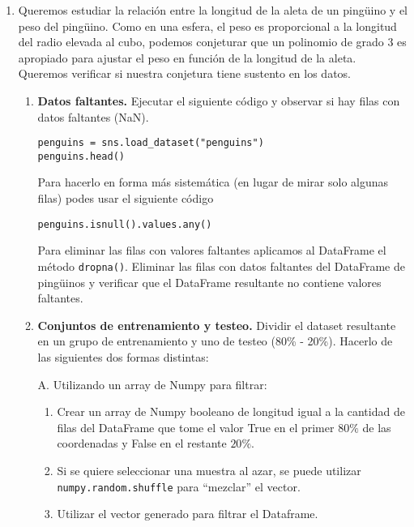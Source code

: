 \documentclass[a4paper,11pt]{article}
\theoremstyle{definition}
\begin{document}
\begin{enumerate}

\item \label{ejer:grado3} Queremos estudiar la relación entre la longitud de la aleta de un ping\"uino y el peso del ping\"uino. Como en una esfera, el peso es proporcional a la longitud del radio elevada al cubo, podemos conjeturar que un polinomio de grado 3 es apropiado para ajustar el peso en función de la longitud de la aleta. Queremos verificar si nuestra conjetura tiene sustento en los datos.
\begin{enumerate}
\item \label{item:nan} \textbf{Datos faltantes.} Ejecutar el siguiente c\'odigo y observar si hay filas con datos faltantes (NaN).
\begin{lstlisting}
penguins = sns.load_dataset("penguins")
penguins.head()
\end{lstlisting}

Para hacerlo en forma más sistemática (en lugar de mirar solo algunas filas) podes usar el siguiente código
\begin{lstlisting}
penguins.isnull().values.any()
\end{lstlisting}

Para eliminar las filas con valores faltantes aplicamos al DataFrame el método \lstinline{dropna()}. Eliminar las filas con datos faltantes del DataFrame de ping\"uinos y verificar que el DataFrame resultante no contiene valores faltantes.

\item \textbf{Conjuntos de entrenamiento y testeo.} Dividir el dataset resultante  en un grupo de entrenamiento y uno de testeo (80\% - 20\%).
Hacerlo de las siguientes dos formas distintas:

\vspace{.5cm}

A. Utilizando un array de Numpy para filtrar:
\begin{enumerate} 
\item Crear un array de Numpy booleano de longitud igual a la cantidad de filas del DataFrame que tome el valor True en el primer $80\%$ de las coordenadas y False en el restante $20\%$.
\item Si se quiere seleccionar una muestra al azar, se puede utilizar \lstinline{numpy.random.shuffle} para ``mezclar'' el vector.
\item Utilizar el vector generado para filtrar el Dataframe.
\end{enumerate}


\end{enumerate}
\end{enumerate}
\end{document}
